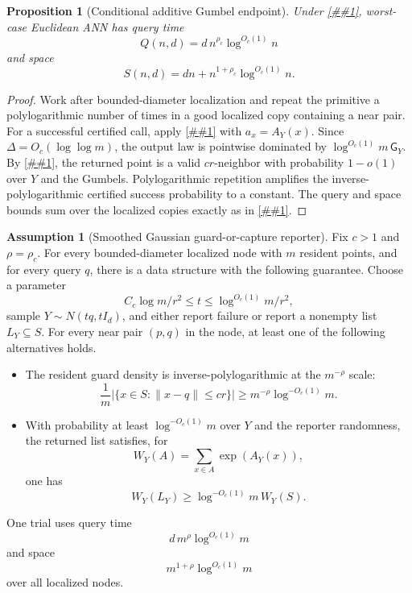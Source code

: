 \documentclass[10pt]{article}
\newcommand{\cref}[1]{\ref{##1}}
\newtheorem{proposition}[theorem]{Proposition}
\theoremstyle{definition}
\newtheorem{assumption}[theorem]{Assumption}
\begin{document}
\begin{proposition}[Conditional additive Gumbel endpoint]\label{prop:gumbel-mips-polylog}
   Under \cref{asm:gumbel-mips}, worst-case Euclidean ANN has query time
   \[
      Q(n,d)=d\,n^{\rho_c}\log^{O_c(1)}n
   \]
   and space
   \[
      S(n,d)=dn+n^{1+\rho_c}\log^{O_c(1)}n.
   \]
\end{proposition}

\begin{proof}
   Work after bounded-diameter localization and repeat the primitive a
   polylogarithmic number of times in a good localized copy containing a near
   pair. For a successful certified call, apply
   \cref{lem:gumbel-additive-domination} with $a_x=A_Y(x)$. Since
   $\Delta=O_c(\log\log m)$, the output law is pointwise dominated by
   $\log^{O_c(1)}m\,\mathsf G_Y$. By
   \cref{lem:smoothed-gibbs-suffices}, the returned point is a valid
   $cr$-neighbor with probability $1-o(1)$ over $Y$ and the Gumbels.
   Polylogarithmic repetition amplifies the inverse-polylogarithmic certified
   success probability to a constant. The query and space bounds sum over the
   localized copies exactly as in \cref{prop:smoothed-gibbs-polylog}.
\end{proof}

\begin{assumption}[Smoothed Gaussian guard-or-capture reporter]\label{asm:smoothed-gibbs}
   Fix $c>1$ and $\rho=\rho_c$. For every bounded-diameter localized node with
   $m$ resident points, and for every query $q$, there is a data structure with
   the following guarantee. Choose a parameter
   \[
      C_c\log m/r^2\le t\le \log^{O_c(1)}m/r^2,
   \]
   sample $Y\sim N(tq,tI_d)$, and either report failure or report a nonempty
   list $L_Y\subseteq S$. For every near pair $(p,q)$ in the node, at least one
   of the following alternatives holds.
   \begin{itemize}
      \item The resident guard density is inverse-polylogarithmic at the
      $m^{-\rho}$ scale:
      \[
         \frac1m|\{x\in S:\|x-q\|\le cr\}|
         \ge
         m^{-\rho}\log^{-O_c(1)}m .
      \]
      \item With probability at least $\log^{-O_c(1)}m$ over $Y$ and the
      reporter randomness, the returned list satisfies, for
   \[
      W_Y(A)=\sum_{x\in A}\exp(A_Y(x)),
   \]
      one has
   \[
      W_Y(L_Y)\ge \log^{-O_c(1)}m\,W_Y(S).
   \]
   \end{itemize}
   One trial uses query time
   \[
      d\,m^\rho\log^{O_c(1)}m
   \]
   and space
   \[
      m^{1+\rho}\log^{O_c(1)}m
   \]
   over all localized nodes.
\end{assumption}
\end{document}
